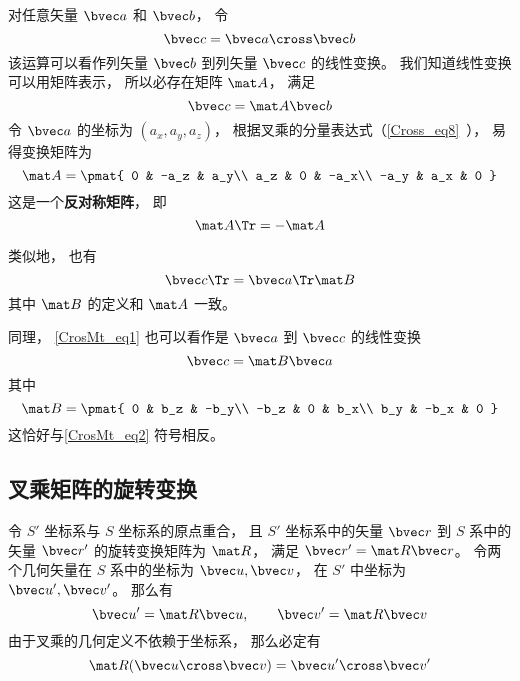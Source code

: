 
对任意矢量 $\bvec a$ 和 $\bvec b$， 令
\begin{equation}\label{CrosMt_eq1}
\bvec c = \bvec a \cross \bvec b
\end{equation}
该运算可以看作列矢量 $\bvec b$ 到列矢量 $\bvec c$ 的线性变换。 我们知道线性变换可以用矩阵表示， 所以必存在矩阵 $\mat A$， 满足
\begin{equation}\label{CrosMt_eq3}
\bvec c = \mat A \bvec b
\end{equation}
令 $\bvec a$ 的坐标为 $(a_x, a_y, a_z)$， 根据叉乘的分量表达式（\autoref{Cross_eq8}~）， 易得变换矩阵为
\begin{equation}\label{CrosMt_eq2}
\mat A = \pmat{
0 & -a_z & a_y\\
a_z & 0 & -a_x\\
-a_y & a_x & 0
}\end{equation}
这是一个\textbf{反对称矩阵}， 即
\begin{equation}
\mat A\Tr = -\mat A
\end{equation}

类似地， 也有
\begin{equation}
\bvec c\Tr = \bvec a\Tr \mat B
\end{equation}
其中 $\mat B$ 的定义和 $\mat A$ 一致。

同理， \autoref{CrosMt_eq1} 也可以看作是 $\bvec a$ 到 $\bvec c$ 的线性变换
\begin{equation}
\bvec c = \mat B \bvec a
\end{equation}
其中
\begin{equation}
\mat B = \pmat{
0 & b_z & -b_y\\
-b_z & 0 & b_x\\
b_y & -b_x & 0
}
\end{equation}
这恰好与\autoref{CrosMt_eq2} 符号相反。

\subsection{叉乘矩阵的旋转变换}\label{CrosMt_sub1}
令 $S'$ 坐标系与 $S$ 坐标系的原点重合， 且 $S'$ 坐标系中的矢量 $\bvec r$ 到 $S$ 系中的矢量 $\bvec r'$ 的旋转变换矩阵为 $\mat R$， 满足 $\bvec r' = \mat R\bvec r$。 令两个几何矢量在 $S$ 系中的坐标为 $\bvec u, \bvec v$， 在 $S'$ 中坐标为 $\bvec u', \bvec v'$。 那么有
\begin{equation}
\bvec u' = \mat R\bvec u, \qquad
\bvec v' = \mat R\bvec v
\end{equation}
由于叉乘的几何定义不依赖于坐标系， 那么必定有
\begin{equation}
\mat R(\bvec u\cross \bvec v) = \bvec u'\cross \bvec v'
\end{equation}

